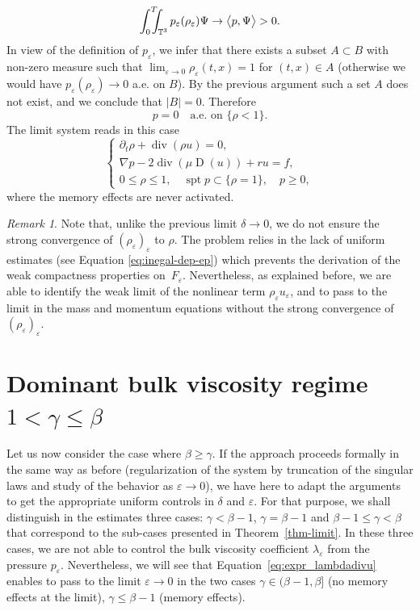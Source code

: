 \documentclass[JEP,XML,SOM,Unicode,NoEqCountersInSection]{cedram}
\newcommand{\<}{\bigl\langle}
\renewcommand{\>}{\bigr\rangle}
\DeclareMathOperator{\spt}{spt}
\newcommand{\intTTT}{\int_0^T\hspace*{-2.5mm}\int_{\TT}}
\newcommand{\labeleq}[1]{}
\newenvironment{subnumcasess}{\begin{equation*}\begin{cases}}{\end{cases}\end{equation*}}
\theoremstyle{definition}
\theoremstyle{remark}
\newtheorem{remark}{Remark}
\newcommand{\TT}{\mathbb{T}^3}
\DeclareMathOperator{\Div}{div}
\DeclareMathOperator{\D}{D}
\let\ep\varepsilon
\begin{document}
\[
\intTTT{p_\ep(\rho_\ep) \Psi} \to \<p,\Psi\> > 0.
\]
In view of the definition of $p_\ep$, we infer that there exists a subset $A \subset B$ with non-zero measure such that $\lim_{\ep \rightarrow 0} \rho_\ep(t,x) = 1$ for $(t,x) \in A$ (otherwise we would have $p_\ep(\rho_\ep) \rightarrow 0$ a.e. on $B$).
By the previous argument such a set $A$ does not exist, and we conclude that $|B|=0$.
Therefore
\begin{equation}\label{eq:spt-p}
p = 0 \quad \text{a.e. on } \{\rho < 1 \}.
\end{equation}
The limit system reads in this case
\begin{subnumcasess}{\labeleq{pb_limit}}
\partial_t \rho + \Div(\rho u) = 0, \\
\nabla p -2\Div(\mu \D(u)) + ru = f, \\
0 \leq \rho \leq 1, \quad \spt p \subset \{ \rho = 1\}, \quad p \geq 0,
\end{subnumcasess}%
where the memory effects are never activated.
\begin{remark}{\label{rmk:cvg-rhoep}}
Note that, unlike the previous limit $\delta\rightarrow 0$, we do not ensure the strong convergence of $(\rho_\ep)_\ep$ to $\rho$.
The problem relies in the lack of uniform estimates (see Equation \eqref{eq:inegal-dep-ep}) which prevents the derivation of the weak compactness properties on~$F_\ep$.
Nevertheless, as explained before, we are able to identify the weak limit of the nonlinear term $\rho_\ep u_\ep$, and to pass to the limit in the mass and momentum equations without the strong convergence of $(\rho_\ep)_\ep$.
\end{remark}

\section{Dominant bulk viscosity regime \texorpdfstring{$1<\gamma\leq \beta$}{1gb}}{\label{sec:bulk}}

Let us now consider the case where $\beta \geq \gamma$.
If the approach proceeds formally in the same way as before (regularization of the system by truncation of the singular laws and study of the behavior as $\ep \rightarrow 0$), we have here to adapt the arguments to get the appropriate uniform controls in $\delta$ and $\ep$.
For that purpose, we shall distinguish in the estimates three cases: $\gamma < \beta-1$, $\gamma = \beta -1$ and $\beta-1 \leq \gamma < \beta$ that correspond to the sub-cases presented in Theorem~\ref{thm-limit}.
In these three cases, we are not able to control the bulk viscosity coefficient $\lambda_\ep$ from the pressure $p_\ep$.
Nevertheless, we will see that Equation~\eqref{eq:expr_lambdadivu} enables to pass to the limit $\ep \rightarrow 0$ in the two cases $\gamma \in (\beta-1, \beta]$ (no memory effects at the limit), $\gamma \leq \beta-1$ (memory effects).
\end{document}
